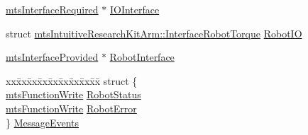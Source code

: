 \begin{DoxyCompactItemize}
\begin{tabbing}
\end{tabbing}\item 
\hyperlink{classmts_interface_required}{mts\+Interface\+Required} $\ast$ \hyperlink{classmts_intuitive_research_kit_arm_af0ea596cde18d92b25eb0b1a5e53ccc3}{I\+O\+Interface}
\item 
struct \hyperlink{structmts_intuitive_research_kit_arm_1_1_interface_robot_torque}{mts\+Intuitive\+Research\+Kit\+Arm\+::\+Interface\+Robot\+Torque} \hyperlink{classmts_intuitive_research_kit_arm_a7112330e6775316517c28a94a116294b}{Robot\+I\+O}
\item 
\hyperlink{classmts_interface_provided}{mts\+Interface\+Provided} $\ast$ \hyperlink{classmts_intuitive_research_kit_arm_a1d8e3354259059e9cc8255a8038b5fc1}{Robot\+Interface}
\item 
\begin{tabbing}
xx\=xx\=xx\=xx\=xx\=xx\=xx\=xx\=xx\=\kill
struct \{\\
\>\hyperlink{classmts_function_write}{mtsFunctionWrite} \hyperlink{classmts_intuitive_research_kit_arm_a375689bcecab40776c6b2e4b732ab2c3}{RobotStatus}\\
\>\hyperlink{classmts_function_write}{mtsFunctionWrite} \hyperlink{classmts_intuitive_research_kit_arm_a79712f082a8907bb4bf6666a45000c64}{RobotError}\\
\} \hyperlink{classmts_intuitive_research_kit_arm_ae087974045dd6bfb37ac8f3680efd314}{MessageEvents}\\


\end{tabbing}
\end{DoxyCompactItemize}
